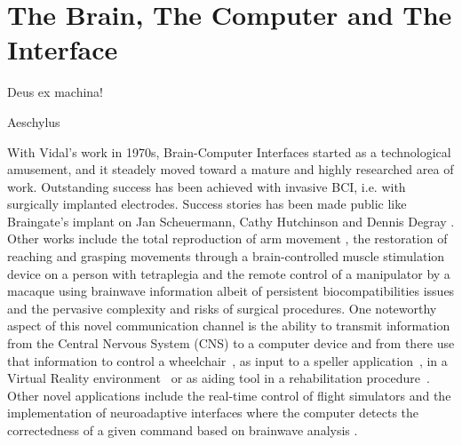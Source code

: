 \chapter{The Brain, The Computer and The Interface}
\label{chapter:one}
\epigraph{Deus ex machina!}{Aeschylus}


\vspace{10px}




With Vidal's work in 1970s, Brain-Computer Interfaces started as a technological amusement, and it steadely moved toward a mature and highly researched area of work.  Outstanding success has been achieved with invasive BCI, i.e. with surgically implanted electrodes. Success stories has been made public like Braingate's implant on Jan Scheuermann, Cathy Hutchinson and Dennis Degray \cite{Pandarinath2017}.  Other works include the total reproduction of arm movement \cite{c27}, the restoration of reaching and grasping movements through a brain-controlled muscle stimulation device on a person with tetraplegia \cite{Ajiboye2017} and the remote control of a manipulator by a macaque using brainwave information \cite{c29} albeit of persistent biocompatibilities issues and the pervasive complexity and risks of surgical procedures. One noteworthy aspect of this novel communication channel is the ability to transmit information from the Central Nervous System (CNS) to a computer device and from there use that information to control a wheelchair~\cite{Carlson2013}, as input to a speller application~\cite{Guger2009a}, in a Virtual Reality environment~\cite{Lotte2013} or as aiding tool in a rehabilitation procedure~\cite{Jure2016}.  Other novel applications include the real-time control of flight simulators \cite{Nourmohammadi2018} and the implementation of neuroadaptive interfaces where the computer detects the correctedness of a given command based on brainwave analysis \cite{Zander2016}.

